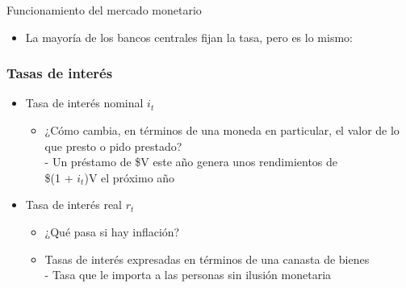 \documentclass{beamer}
\begin{document}
\begin{frame}{Funcionamiento del mercado monetario}
    \begin{itemize}
    \item La mayoría de los bancos centrales fijan la tasa, pero es lo mismo:
    \end{itemize}
    \vspace{0.4cm}
\begin{center}
\begin{figure}[H]
\renewcommand{\figurename}{Figure}
\begin{center}
\end{center}
\end{figure}
\end{center} 
\end{frame}

\begin{frame}
\frametitle{Tasas de interés}
\begin{itemize}
    \item Tasa de interés nominal $i_t$
    \begin{itemize}
        \item ¿Cómo cambia, en términos de una moneda en particular, el valor de lo que presto o pido prestado? \\
        - Un préstamo de \$V este año genera unos rendimientos de \\ \$(1 + $i_t$)V el próximo año
    \end{itemize} \vspace{4mm}
    \item Tasa de interés real $r_t$
    \begin{itemize}
        \item ¿Qué pasa si hay inflación?
        \item Tasas de interés expresadas en términos de una canasta de bienes \\
        - Tasa que le importa a las personas sin ilusión monetaria
        \end{itemize}
    \end{itemize}
\end{frame}
\end{document}
